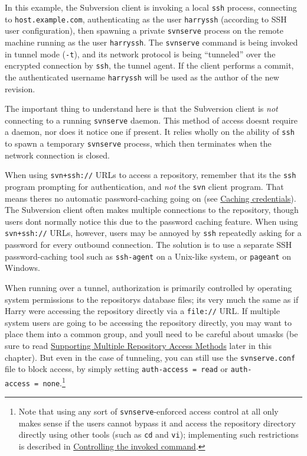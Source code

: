 In this example, the Subversion client is invoking a local \texttt{ssh}
process, connecting to \texttt{host.example.com}, authenticating as the
user \texttt{harryssh} (according to SSH user configuration), then
spawning a private \texttt{svnserve} process on the remote machine
running as the user \texttt{harryssh}. The \texttt{svnserve} command is
being invoked in tunnel mode (\texttt{-t}), and its network protocol is
being ``tunneled'' over the encrypted connection by \texttt{ssh}, the
tunnel agent. If the client performs a commit, the authenticated
username \texttt{harryssh} will be used as the author of the new
revision.

The important thing to understand here is that the Subversion client is
\emph{not} connecting to a running \texttt{svnserve} daemon. This method
of access doesn\textquotesingle t require a daemon, nor does it notice
one if present. It relies wholly on the ability of \texttt{ssh} to spawn
a temporary \texttt{svnserve} process, which then terminates when the
network connection is closed.

When using \texttt{svn+ssh://} URLs to access a repository, remember
that it\textquotesingle s the \texttt{ssh} program prompting for
authentication, and \emph{not} the \texttt{svn} client program. That
means there\textquotesingle s no automatic password-caching going on
(see \hyperref[svn.serverconfig.netmodel.credcache]{Caching
credentials}). The Subversion client often makes multiple connections to
the repository, though users don\textquotesingle t normally notice this
due to the password caching feature. When using \texttt{svn+ssh://}
URLs, however, users may be annoyed by \texttt{ssh} repeatedly asking
for a password for every outbound connection. The solution is to use a
separate SSH password-caching tool such as \texttt{ssh-agent} on a
Unix-like system, or \texttt{pageant} on Windows.

When running over a tunnel, authorization is primarily controlled by
operating system permissions to the repository\textquotesingle s
database files; it\textquotesingle s very much the same as if Harry were
accessing the repository directly via a \texttt{file://} URL. If
multiple system users are going to be accessing the repository directly,
you may want to place them into a common group, and
you\textquotesingle ll need to be careful about umasks (be sure to read
\hyperref[svn.serverconfig.multimethod]{Supporting Multiple Repository
Access Methods} later in this chapter). But even in the case of
tunneling, you can still use the \texttt{svnserve.conf} file to block
access, by simply setting \texttt{auth-access\ =\ read} or
\texttt{auth-access\ =\ none}.\footnote{Note that using any sort of
  \texttt{svnserve}-enforced access control at all only makes sense if
  the users cannot bypass it and access the repository directory
  directly using other tools (such as \texttt{cd} and \texttt{vi});
  implementing such restrictions is described in
  \hyperref[svn.serverconfig.svnserve.sshtricks.fixedcmd]{Controlling
  the invoked command}.}


